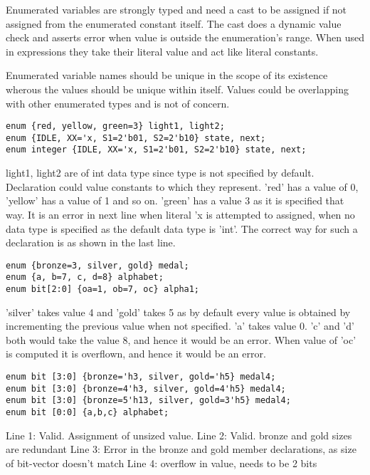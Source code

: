 Enumerated variables are strongly typed and need a cast to be assigned
if not assigned from the enumerated constant itself. The cast does a
dynamic value check and asserts error when value is outside the
enumeration's range. When used in expressions they take their literal
value and act like literal constants.

Enumerated variable names should be unique in the scope of its
existence wherous the values should be unique within itself. Values
could be overlapping with other enumerated types and is not of
concern.

\begin{lstlisting}[label=lst!literal!enum1, caption=Enum Declaration
    Example]
enum {red, yellow, green=3} light1, light2;
enum {IDLE, XX='x, S1=2'b01, S2=2'b10} state, next;
enum integer {IDLE, XX='x, S1=2'b01, S2=2'b10} state, next;
\end{lstlisting}

light1, light2 are of int data type since type is not specified by
default.  Declaration could value constants to which they
represent. 'red' has a value of 0, 'yellow' has a value of 1 and so
on. 'green' has a value 3 as it is specified that way.  It is an error
in next line when literal 'x is attempted to assigned, when no data
type is specified as the default data type is 'int'. The correct way
for such a declaration is as shown in the last line.

\begin{lstlisting}[label=lst!literal!enum2, caption=Enum Declaration
    Examples]
enum {bronze=3, silver, gold} medal;
enum {a, b=7, c, d=8} alphabet;
enum bit[2:0] {oa=1, ob=7, oc} alpha1;
\end{lstlisting}

'silver' takes value 4 and 'gold' takes 5 as by default every value is
obtained by incrementing the previous value when not specified.  'a'
takes value 0. 'c' and 'd' both would take the value 8, and hence it
would be an error.  When value of 'oc' is computed it is overflown,
and hence it would be an error.

\begin{lstlisting}[label=lst!literal!enum3, caption=Enum Declaration
    Examples]
enum bit [3:0] {bronze='h3, silver, gold='h5} medal4;
enum bit [3:0] {bronze=4'h3, silver, gold=4'h5} medal4;
enum bit [3:0] {bronze=5'h13, silver, gold=3'h5} medal4;
enum bit [0:0] {a,b,c} alphabet;
\end{lstlisting}

Line 1: Valid. Assignment of unsized value.
Line 2: Valid. bronze and gold sizes are redundant
Line 3: Error in the bronze and gold member
declarations, as size of bit-vector doesn't match
Line 4: overflow in value, needs to be 2 bits

